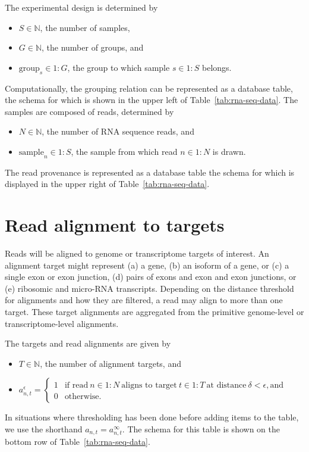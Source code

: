 \documentclass[11pt]{report}
\newcommand{\rngto}[1]{1{:}#1}
\begin{document}
The experimental design is determined by
%
\begin{itemize}
\item $S \in \mathbb{N}$, the number of samples,
\item $G \in \mathbb{N}$, the number of groups, and
\item $\textrm{group}_s \in \rngto{G}$, the group to which sample $s \in \rngto{S}$ belongs.
\end{itemize}
%
Computationally, the grouping relation can be represented as a
database table, the schema for which is shown in the upper left of
Table~\ref{tab:rna-seq-data}. The samples are composed of reads,
determined by
%
\begin{itemize}
\item $N \in \mathbb{N}$, the number of RNA sequence reads, and
\item $\textrm{sample}_n \in \rngto{S}$, the sample from which read $n \in \rngto{N}$ is drawn.
\end{itemize}
%
The read provenance is represented as a database table the schema for
which is displayed in the upper right of Table~\ref{tab:rna-seq-data}.


\section{Read alignment to targets}

Reads will be aligned to genome or transcriptome targets of interest.
An alignment target might represent (a) a gene, (b) an isoform of a
gene, or (c) a single exon or exon junction, (d) pairs of exons and
exon and exon junctions, or (e) ribosomic and micro-RNA transcripts.
Depending on the distance threshold for alignments and how they are
filtered, a read may align to more than one target. These target
alignments are aggregated from the primitive genome-level or
transcriptome-level alignments.

The targets and read alignments are given by
%
\begin{itemize}
\item $T \in \mathbb{N}$, the number of alignment targets, and
\item $a^{\epsilon}_{n, t} =
  \begin{cases}
    1 & \textrm{if read} \ n \in \rngto{N}
        \ \textrm{aligns to target} \ t \in \rngto{T}
        \ \textrm{at distance} \ \delta < \epsilon,
         \textrm{and}
    \\
    0 & \textrm{otherwise.}
  \end{cases}$
\end{itemize}
%
In situations where thresholding has been done before adding items to
the table, we use the shorthand $a_{n,t} = a^{\infty}_{n,t}$. The
schema for this table is shown on the bottom row of
Table~\ref{tab:rna-seq-data}.
\end{document}
